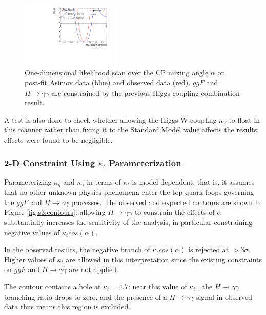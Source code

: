 \begin{figure}[htbp]
  \centering
  \includegraphics[width=0.4\textwidth]{figures/tthcp_results/nllscan_alpha_expobs_scale.pdf}
  \caption{One-dimensional likelihood scan over the CP mixing angle $\alpha$ on post-fit Asimov data (blue) and observed data (red). 
 $ggF$ and $H \rightarrow \gamma\gamma$ are constrained by the previous Higgs coupling combination result.
  \label{fig:alphascan_expobs_scale}}
\end{figure}

A test is also done to check whether allowing the Higgs-W coupling $\kappa_{V}$ to float in this manner rather than fixing it to the Standard Model value affects the results; effects were found to be negligible.

\subsubsection{2-D Constraint Using $\kappa_{t}$ Parameterization}

Parameterizing $\kappa_{g}$ and $\kappa_{\gamma}$ in terms of $\kappa_{t}$ is model-dependent, that is, it assumes that no other unknown physics phenomena enter the top-quark loops governing the $ggF$ and $H \rightarrow \gamma \gamma$ processes. The observed and expected contours are shown in Figure \ref{fig:s3:contours}: allowing $H \rightarrow \gamma \gamma$ to constrain the effects of $\alpha$ substantially increases the sensitivity of the analysis, in particular constraining negative values of $\kappa_{t} cos(\alpha)$.

In the observed results, the negative branch of $\kappa_{t}cos(\alpha)$ is rejected at $> 3\sigma$. Higher values of $\kappa_{t}$ are allowed in this interpretation since the existing constraints on $ggF$ and $H \rightarrow \gamma \gamma$ are not applied.

The contour contains a hole at $\kappa_{t} = 4.7$: near this value of $\kappa_{t}$ , the $H \rightarrow \gamma \gamma$ branching ratio drops to zero, and the presence of a $H \rightarrow \gamma \gamma$ signal in observed data thus means this region is excluded.

